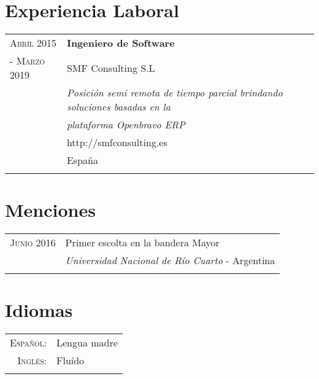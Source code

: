 \documentclass[a4paper,10pt]{article} %
\begin{document}
\section{Experiencia Laboral}
\begin{tabular}{ll}
\textsc{Abril 2015} & \textbf{Ingeniero de Software} \\
\textsc{- Marzo 2019} & SMF Consulting S.L \\ 
& \textit{Posición semi remota de tiempo parcial brindando soluciones basadas en la} \\
& \textit{plataforma Openbravo ERP} \\  
& http://smfconsulting.es \\
& España \\ & \\
\end{tabular}



\section{Menciones}
\begin{tabular}{rl}
\\
\textsc{Junio 2016} & Primer escolta en la bandera Mayor \\ & \textit{Universidad Nacional de Río Cuarto} - Argentina \\ & \\ 
\end{tabular}

\section{Idiomas}

\begin{tabular}{rl}
\\
\textsc{Español:} & Lengua madre\\
\textsc{Inglés:} & Fluído \\ & \\
\end{tabular}
\end{document}
